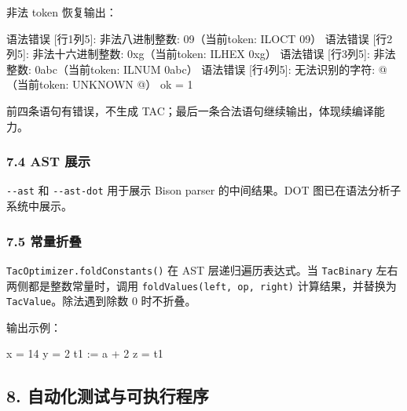 \documentclass[
  a4paper,
  fontset=none,
]{ctexart}
\newenvironment{Shaded}{}{}
\newcommand{\NormalTok}[1]{#1}
\begin{document}
非法 token 恢复输出：

\begin{Shaded}
\begin{Highlighting}[]
\NormalTok{语法错误 [行1列5]: 非法八进制整数: 09（当前token: ILOCT \textquotesingle{}09\textquotesingle{}）}
\NormalTok{语法错误 [行2列5]: 非法十六进制整数: 0xg（当前token: ILHEX \textquotesingle{}0xg\textquotesingle{}）}
\NormalTok{语法错误 [行3列5]: 非法整数: 0abc（当前token: ILNUM \textquotesingle{}0abc\textquotesingle{}）}
\NormalTok{语法错误 [行4列5]: 无法识别的字符: \textquotesingle{}@\textquotesingle{}（当前token: UNKNOWN \textquotesingle{}@\textquotesingle{}）}
\NormalTok{ok = 1}
\end{Highlighting}
\end{Shaded}

前四条语句有错误，不生成 TAC；最后一条合法语句继续输出，体现续编译能力。

\hypertarget{ast-ux5c55ux793a}{%
\subsubsection{7.4 AST 展示}\label{ast-ux5c55ux793a}}

\texttt{-\/-ast} 和 \texttt{-\/-ast-dot} 用于展示 Bison parser
的中间结果。DOT 图已在语法分析子系统中展示。

\hypertarget{ux5e38ux91cfux6298ux53e0}{%
\subsubsection{7.5 常量折叠}\label{ux5e38ux91cfux6298ux53e0}}

\texttt{TacOptimizer.foldConstants()} 在 AST 层递归遍历表达式。当
\texttt{TacBinary} 左右两侧都是整数常量时，调用
\texttt{foldValues(left,\ op,\ right)} 计算结果，并替换为
\texttt{TacValue}。除法遇到除数 0 时不折叠。

输出示例：

\begin{Shaded}
\begin{Highlighting}[]
\NormalTok{x = 14}
\NormalTok{y = 2}
\NormalTok{t1 := a + 2}
\NormalTok{z = t1}
\end{Highlighting}
\end{Shaded}

\hypertarget{ux81eaux52a8ux5316ux6d4bux8bd5ux4e0eux53efux6267ux884cux7a0bux5e8f}{%
\subsection{8.
自动化测试与可执行程序}\label{ux81eaux52a8ux5316ux6d4bux8bd5ux4e0eux53efux6267ux884cux7a0bux5e8f}}
\end{document}
